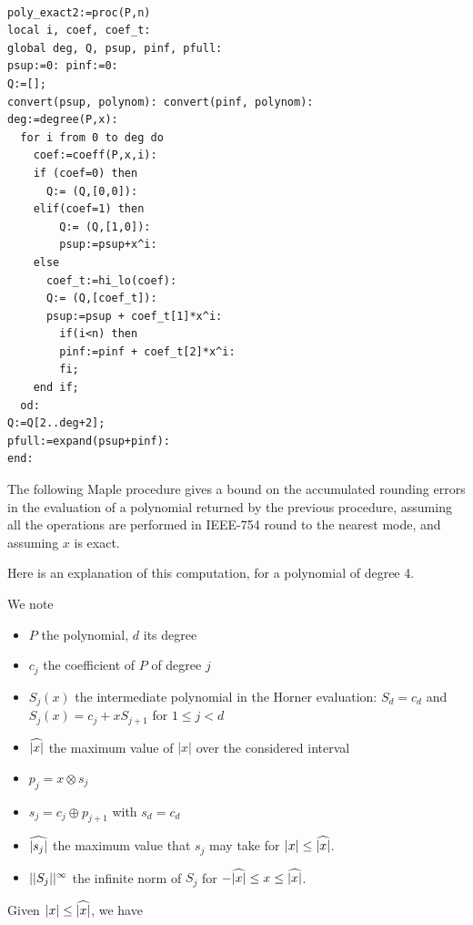 \begin{lstlisting}[caption={poly\_exact2},firstnumber=1]

poly_exact2:=proc(P,n)
local i, coef, coef_t:
global deg, Q, psup, pinf, pfull:
psup:=0: pinf:=0:
Q:=[];
convert(psup, polynom): convert(pinf, polynom):
deg:=degree(P,x):
  for i from 0 to deg do
    coef:=coeff(P,x,i):
    if (coef=0) then
      Q:= (Q,[0,0]):
    elif(coef=1) then
        Q:= (Q,[1,0]):
        psup:=psup+x^i:
    else        
      coef_t:=hi_lo(coef):
      Q:= (Q,[coef_t]):
      psup:=psup + coef_t[1]*x^i:
        if(i<n) then
        pinf:=pinf + coef_t[2]*x^i:
        fi;
    end if;
  od:
Q:=Q[2..deg+2];
pfull:=expand(psup+pinf):
end:
\end{lstlisting}
\vspace{0.5cm}



The following Maple procedure gives a bound on the accumulated
rounding errors in the evaluation of a polynomial returned by the
previous procedure, assuming all the operations are performed in
IEEE-754 round to the nearest mode, and assuming $x$ is exact.

Here is an explanation of this computation, for a polynomial of degree 4.





 We note 
\begin{itemize}
\item $P$ the polynomial, $d$ its degree
\item $c_j$ the coefficient of $P$ of degree $j$
\item $S_j(x)$ the intermediate polynomial in the Horner evaluation:
  $S_d=c_d$ and $S_j(x) = c_j+xS_{j+1}$ for $1\le j <d$
\item ${\widehat{|x|}}$ the maximum value of $|x|$ over the considered interval
\item $p_j = x \otimes s_j $ 
\item $s_j =   c_j \oplus p_{j+1}$ with $s_d = c_d$ 
\item $\widehat{|s_{j}|}$ the  maximum value that $s_j$ may take for $|x|
  \le {\widehat{|x|}}$.
\item $||{S_j}||^{\infty}$ the infinite norm of $S_j$ for $-{\widehat{|x|}} \le
  x\le {\widehat{|x|}}$.
\end{itemize}

Given $ |x| \leq {\widehat{|x|}}$, we have

